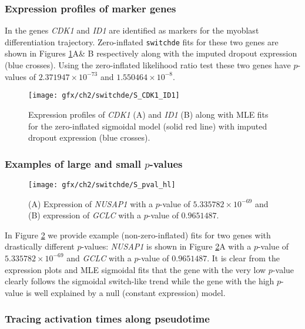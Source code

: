 \subsubsection{Expression profiles of marker genes}

In \cite{trapnell2014dynamics} the genes \emph{CDK1} and \emph{ID1} are identified as markers for the myoblast differentiation trajectory. Zero-inflated \texttt{switchde} fits for these two genes are shown in Figures \ref{fig:S1}A\& B respectively along with the imputed dropout expression (blue crosses). Using the zero-inflated likelihood ratio test these two genes have $p$-values of $2.371947 \times 10^{-73}$ and $1.550464 \times 10^{-8}$.

\begin{figure}[h]
\centering
\texttt{[image: gfx/ch2/switchde/S\_CDK1\_ID1]}
\caption{Expression profiles of \emph{CDK1} (A) and \emph{ID1} (B) along with MLE fits for the zero-inflated sigmoidal model (solid red line) with imputed dropout expression (blue crosses).}\label{fig:S1}
\end{figure}

\subsubsection{Examples of large and small $p$-values}

\begin{figure}[h]%
\centering
\texttt{[image: gfx/ch2/switchde/S\_pval\_hl]}
\caption{(A) Expression of \emph{NUSAP1} with a $p$-value of $5.335782 \times 10^{-69}$ and (B) expression of \emph{GCLC} with a $p$-value of $0.9651487$.}\label{fig:S2}
\end{figure}

In Figure \ref{fig:S2} we provide example (non-zero-inflated) fits for two genes with drastically different $p$-values: \emph{NUSAP1} is shown in Figure \ref{fig:S2}A with a $p$-value of $5.335782 \times 10^{-69}$ and \emph{GCLC} with a $p$-value of $0.9651487$. It is clear from the expression plots and MLE sigmoidal fits that the gene with the very low $p$-value clearly follows the sigmoidal switch-like trend while the gene with the high $p$-value is well explained by a null (constant expression) model.

\subsubsection{Tracing activation times along pseudotime}


